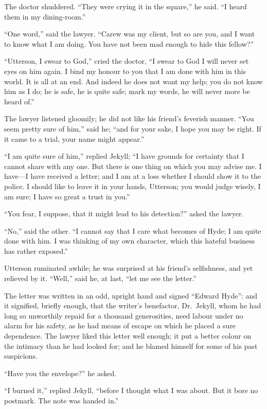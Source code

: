 \documentclass[12pt,openright]{book}
\begin{document}
The doctor shuddered. “They were crying it in the square,” he said. “I heard them in my dining-room.”

“One word,” said the lawyer. “Carew was my client, but so are you, and I want to know what I am doing. You have not been mad enough to hide this fellow?”

“Utterson, I swear to God,” cried the doctor, “I swear to God I will never set eyes on him again. I bind my honour to you that I am done with him in this world. It is all at an end. And indeed he does not want my help; you do not know him as I do; he is safe, he is quite safe; mark my words, he will never more be heard of.”

The lawyer listened gloomily; he did not like his friend’s feverish manner. “You seem pretty sure of him,” said he; “and for your sake, I hope you may be right. If it came to a trial, your name might appear.”

“I am quite sure of him,” replied Jekyll; “I have grounds for certainty that I cannot share with any one. But there is one thing on which you may advise me. I have—I have received a letter; and I am at a loss whether I should show it to the police. I should like to leave it in your hands, Utterson; you would judge wisely, I am sure; I have so great a trust in you.”

“You fear, I suppose, that it might lead to his detection?” asked the lawyer.

“No,” said the other. “I cannot say that I care what becomes of Hyde; I am quite done with him. I was thinking of my own character, which this hateful business has rather exposed.”

Utterson ruminated awhile; he was surprised at his friend’s selfishness, and yet relieved by it. “Well,” said he, at last, “let me see the letter.”

The letter was written in an odd, upright hand and signed “Edward Hyde”: and it signified, briefly enough, that the writer’s benefactor, Dr. Jekyll, whom he had long so unworthily repaid for a thousand generosities, need labour under no alarm for his safety, as he had means of escape on which he placed a sure dependence. The lawyer liked this letter well enough; it put a better colour on the intimacy than he had looked for; and he blamed himself for some of his past suspicions.

“Have you the envelope?” he asked.

“I burned it,” replied Jekyll, “before I thought what I was about. But it bore no postmark. The note was handed in.”
\end{document}
